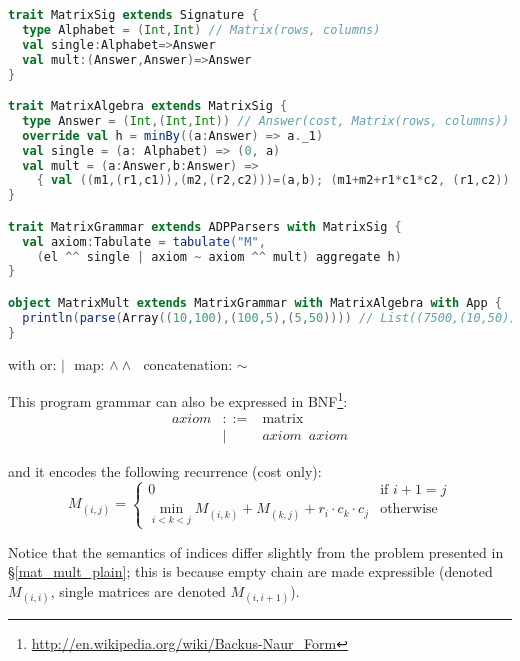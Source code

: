 \begin{lstlisting}[language=Scala, caption=Matrix chain mulitiplication DSL implementation]
trait MatrixSig extends Signature {
  type Alphabet = (Int,Int) // Matrix(rows, columns)
  val single:Alphabet=>Answer
  val mult:(Answer,Answer)=>Answer
}

trait MatrixAlgebra extends MatrixSig {
  type Answer = (Int,(Int,Int)) // Answer(cost, Matrix(rows, columns))
  override val h = minBy((a:Answer) => a._1)
  val single = (a: Alphabet) => (0, a)
  val mult = (a:Answer,b:Answer) =>
    { val ((m1,(r1,c1)),(m2,(r2,c2)))=(a,b); (m1+m2+r1*c1*c2, (r1,c2)) }
}

trait MatrixGrammar extends ADPParsers with MatrixSig {
  val axiom:Tabulate = tabulate("M",
    (el ^^ single | axiom ~ axiom ^^ mult) aggregate h)
}

object MatrixMult extends MatrixGrammar with MatrixAlgebra with App {
  println(parse(Array((10,100),(100,5),(5,50)))) // List((7500,(10,50)))
}
\end{lstlisting}
\begin{center}\vspace{-18pt} with or: $|\,\,$ map: $\land\land\,\,$ concatenation: $\sim$ \end{center}

This program grammar can also be expressed in BNF\footnote{\url{http://en.wikipedia.org/wiki/Backus-Naur\_Form}}:
\[\begin{array}{lrl}
axiom &::=& \text{matrix} \\
 &|& axiom \,\,\, axiom
\end{array}\]

and it encodes the following recurrence (cost only):
	\[M_{(i,j)}=\left\{\begin{array}{ll}
		0 & \text{if } i+1= j\\
		\min_{i<k<j} M_{(i,k)}+M_{(k,j)}+r_i \cdot c_k \cdot c_j & \text{otherwise}
	\end{array}\right. \]

Notice that the semantics of indices differ slightly from the problem presented in \S\ref{mat_mult_plain}; this is because empty chain are made expressible (denoted $M_{(i,i)}$, single matrices are denoted $M_{(i,i+1)}$).

\newpage
